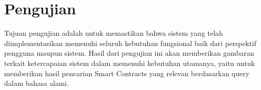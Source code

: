 \section{Pengujian}

Tujuan pengujian adalah untuk memastikan bahwa sistem yang telah diimplementasikan memenuhi seluruh kebutuhan fungsional baik dari perspektif pengguna maupun sistem. Hasil dari pengujian ini akan memberikan gambaran terkait ketercapaian sistem dalam memenuhi kebutuhan utamanya, yaitu untuk memberikan hasil pencarian Smart Contracts yang relevan berdasarkan query dalam bahasa alami.















